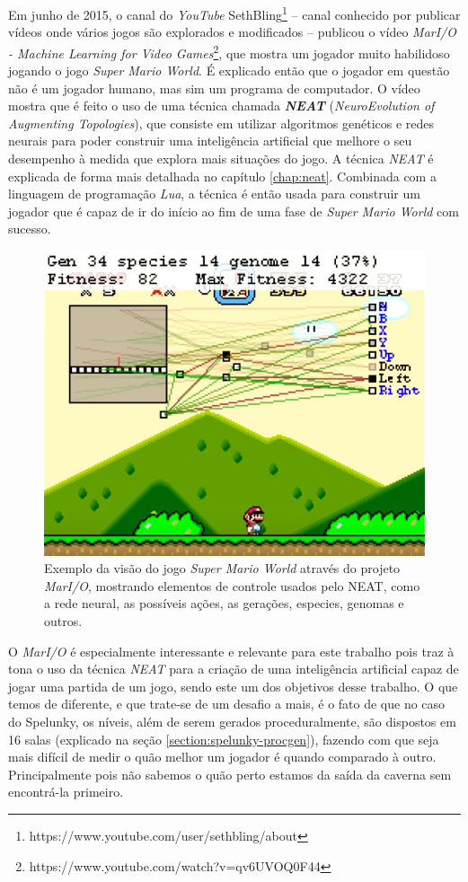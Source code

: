 Em junho de 2015, o canal do \textit{YouTube}
SethBling\footnote{https://www.youtube.com/user/sethbling/about} -- canal
conhecido por publicar vídeos onde vários jogos são explorados e modificados -- 
publicou o vídeo \textit{MarI/O - Machine Learning for Video
Games}\footnote{https://www.youtube.com/watch?v=qv6UVOQ0F44}, que mostra um
jogador muito habilidoso jogando o jogo \textit{Super Mario World}. É explicado
então que o jogador em questão não é um jogador humano, mas sim um programa de
computador.
O vídeo mostra que é feito o uso de uma técnica chamada
\textit{\textbf{NEAT}} (\textit{NeuroEvolution of Augmenting
Topologies})\cite{stanley:ec02}, que consiste em utilizar algoritmos
genéticos e redes neurais para poder construir uma inteligência artificial
que melhore o seu desempenho à medida que explora mais situações do jogo. A
técnica \textit{NEAT} é explicada de forma mais detalhada no capítulo
\ref{chap:neat}. Combinada com a linguagem de programação \textit{Lua}, a
técnica é então usada para construir um jogador que é capaz de ir do início ao
fim de uma fase de \textit{Super Mario World} com sucesso.

\begin{figure}[htb!]
\centering
\includegraphics[width=.65\textwidth]{fig/mar-io-example.png}
\caption{\label{fig:mar-io-example}Exemplo da visão do jogo \textit{Super
Mario World} através do projeto \textit{MarI/O}, mostrando elementos de
controle usados pelo NEAT, como a rede neural, as possíveis ações, as
gerações, especies, genomas e outros.}
\end{figure}

O \textit{MarI/O} é especialmente interessante e relevante para este trabalho
pois traz à tona o uso da técnica \textit{NEAT} para a criação de uma
inteligência artificial capaz de jogar uma partida de um jogo, sendo este
um dos objetivos desse trabalho. O que temos de diferente, e que trate-se de um
desafio a mais, é o fato de que no caso do Spelunky, os níveis, além de serem
gerados proceduralmente, são dispostos em 16 salas (explicado na seção
\ref{section:spelunky-procgen}), fazendo com que seja mais difícil de
medir o quão melhor um jogador é quando comparado à outro. Principalmente
pois não sabemos o quão perto estamos da saída da caverna sem encontrá-la
primeiro.
